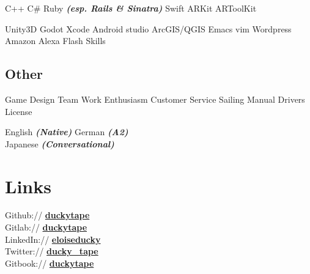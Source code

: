 \documentclass[a4paper]{deedy-resume} %
\begin{document}
\begin{minipage}[t]{0.33\textwidth}
\sectionspace

C++ \textbullet{} C\# \textbullet{} Ruby {\footnotesize \textit{\textbf{(esp. Rails \& Sinatra)}}}
Swift \textbullet{} ARKit \textbullet{} ARToolKit \\

\sectionspace

Unity3D \textbullet{} Godot \textbullet{} Xcode \textbullet{} Android studio \textbullet{} ArcGIS/QGIS \textbullet{}
Emacs \textbullet{} vim \textbullet{} Wordpress \textbullet{} Amazon Alexa Flash Skills\\

\sectionspace

\subsection{Other}
\sectionspace
Game Design \textbullet{} Team Work \textbullet{} Enthusiasm \textbullet{} Customer Service \textbullet{} Sailing \textbullet{} Manual Drivers License\\

\sectionspace

English {\footnotesize \textit{\textbf{(Native)}}} \textbullet{} German {\footnotesize \textit{\textbf{(A2)}}} \textbullet{} \\
Japanese {\footnotesize \textit{\textbf{(Conversational)}}} \\

\sectionspace %


\section{Links}

Github:// \href{https://github.com/duckytape}{\bf duckytape} \\
Gitlab:// \href{https://gitlab.com/duckytape} {\bf duckytape} \\
LinkedIn:// \href{https://www.linkedin.com/in/eloiseducky}{\bf eloiseducky} \\
Twitter:// \href{https://twitter.com/ducky_tape}{\bf ducky\_tape}\\
Gitbook:// \href{https:duckytape.gitbooks.io//}{\bf duckytape} \\

\sectionspace %


\end{minipage} %
\end{document}
